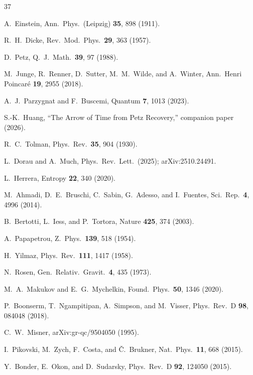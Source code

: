 \documentclass[prl,twocolumn,superscriptaddress,floatfix,nofootinbib]{revtex4-2}
\begin{document}
\begin{thebibliography}{37}

A.~Einstein,
Ann.\ Phys.\ (Leipzig) \textbf{35}, 898 (1911).

R.~H.~Dicke,
Rev.\ Mod.\ Phys.\ \textbf{29}, 363 (1957).

D.~Petz,
Q.\ J.\ Math.\ \textbf{39}, 97 (1988).

M.~Junge, R.~Renner, D.~Sutter, M.~M.~Wilde, and A.~Winter,
Ann.\ Henri Poincar\'{e} \textbf{19}, 2955 (2018).

A.~J.~Parzygnat and F.~Buscemi,
Quantum \textbf{7}, 1013 (2023).

S.-K.~Huang,
``The Arrow of Time from Petz Recovery,''
companion paper (2026).

R.~C.~Tolman,
Phys.\ Rev.\ \textbf{35}, 904 (1930).

L.~Dorau and A.~Much,
Phys.\ Rev.\ Lett.\ (2025);
arXiv:2510.24491.

L.~Herrera,
Entropy \textbf{22}, 340 (2020).

M.~Ahmadi, D.~E.~Bruschi, C.~Sabin, G.~Adesso,
and I.~Fuentes,
Sci.\ Rep.\ \textbf{4}, 4996 (2014).

B.~Bertotti, L.~Iess, and P.~Tortora,
Nature \textbf{425}, 374 (2003).

A.~Papapetrou,
Z.\ Phys.\ \textbf{139}, 518 (1954).

H.~Yilmaz,
Phys.\ Rev.\ \textbf{111}, 1417 (1958).

N.~Rosen,
Gen.\ Relativ.\ Gravit.\ \textbf{4}, 435 (1973).

M.~A.~Makukov and E.~G.~Mychelkin,
Found.\ Phys.\ \textbf{50}, 1346 (2020).

P.~Boonserm, T.~Ngampitipan, A.~Simpson, and M.~Visser,
Phys.\ Rev.\ D \textbf{98}, 084048 (2018).

C.~W.~Misner,
arXiv:gr-qc/9504050 (1995).

I.~Pikovski, M.~Zych, F.~Costa, and \v{C}.~Brukner,
Nat.\ Phys.\ \textbf{11}, 668 (2015).

Y.~Bonder, E.~Okon, and D.~Sudarsky,
Phys.\ Rev.\ D \textbf{92}, 124050 (2015).


\end{thebibliography}
\end{document}
